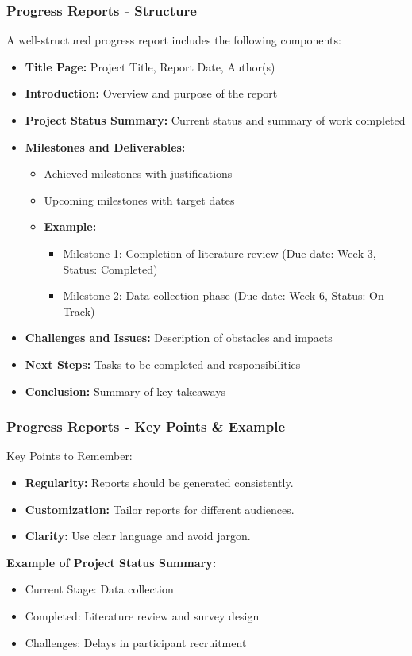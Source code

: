 \documentclass[aspectratio=169]{beamer}
\begin{document}
\begin{frame}[fragile]
    \frametitle{Progress Reports - Structure}
    A well-structured progress report includes the following components:
    \begin{itemize}
        \item \textbf{Title Page:} Project Title, Report Date, Author(s)
        \item \textbf{Introduction:} Overview and purpose of the report
        \item \textbf{Project Status Summary:} Current status and summary of work completed
        \item \textbf{Milestones and Deliverables:}
            \begin{itemize}
                \item Achieved milestones with justifications
                \item Upcoming milestones with target dates
                \item \textbf{Example:}
                \begin{itemize}
                    \item Milestone 1: Completion of literature review (Due date: Week 3, Status: Completed)
                    \item Milestone 2: Data collection phase (Due date: Week 6, Status: On Track)
                \end{itemize}
            \end{itemize}
        \item \textbf{Challenges and Issues:} Description of obstacles and impacts
        \item \textbf{Next Steps:} Tasks to be completed and responsibilities
        \item \textbf{Conclusion:} Summary of key takeaways
    \end{itemize}
\end{frame}

\begin{frame}[fragile]
    \frametitle{Progress Reports - Key Points & Example}
    Key Points to Remember:
    \begin{itemize}
        \item \textbf{Regularity:} Reports should be generated consistently.
        \item \textbf{Customization:} Tailor reports for different audiences.
        \item \textbf{Clarity:} Use clear language and avoid jargon.
    \end{itemize}
    \bigskip
    \textbf{Example of Project Status Summary:}
    \begin{itemize}
        \item Current Stage: Data collection
        \item Completed: Literature review and survey design
        \item Challenges: Delays in participant recruitment
    \end{itemize}
\end{frame}
\end{document}
